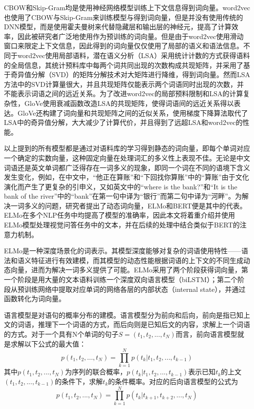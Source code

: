 CBOW和Skip-Gram均是使用神经网络模型训练上下文信息得到词向量。word2vec也使用了CBOW与Skip-Gram来训练模型与得到词向量，但是并没有使用传统的DNN模型，而是使用霍夫曼树来代替隐藏层和输出层的神经元，提高了计算效率，因此被研究者广泛地使用作为预训练的词向量。但是由于word2vec使用滑动窗口来限定上下文信息，因此得到的词向量仅仅使用了局部的语义和语法信息。不同于word2vec使用局部语料，潜在语义分析（LSA）采用统计计数的方式获得语料的全局信息，其统计预料库中每两个词共同出现的次数构成共现矩阵，并采用了基于奇异值分解（SVD）的矩阵分解技术对大矩阵进行降维，得到词向量。然而LSA方法中的SVD计算量很大，并且共现矩阵仅能表示两个词语同时出现的次数，并不能表示词语之间的远近关系。为了改进word2vec的局部预料限制和LSA的计算复杂性，GloVe使用衰减函数改造LSA的共现矩阵，使得词语间的远近关系得以表达。GloVe还构建了词向量和共现矩阵之间的近似关系，使用梯度下降算法取代了LSA中的奇异值分解，大大减少了计算代价，并且得到了远超LSA和word2vec的性能。

以上提到的所有模型都是通过对语料库的学习得到静态的词向量，即每个单词对应一个确定的实数向量，这种固定向量在处理词汇的多义性上表现不佳。无论是中文词语还是英文单词都广泛得存在一词多义的现象，即同一个词在不同的语境下含义发生变化，例如，在中文中，“他正在算账”和“下回找你算账”中的“算账”由于文化演化而产生了更复杂的引申义，又如英文中的“where is the bank?”和“It is the bank of the river”中的“bank”在第一句中译为“银行”而第二句中译为“河畔”。为解决一词多义的问题，研究者提出了动态词向量，ELMo和BERT便是其中的代表。ELMo在多个NLP任务中均提高了模型的准确率，因此本文将着重介绍并使用ELMo模型处理视觉问答任务中的文本，并在后续的处理中结合类似于BERT的注意力机制。

ELMo是一种深度场景化的词表示。其模型深度能够对复杂的词语使用特性——语法和语义特征进行有效建模，而其模型的动态性能根据词语的上下文的不同生成动态向量，进而为解决一词多义提供了可能。ELMo采用了两个阶段获得词向量，第一个阶段是用大量的文本语料训练一个深度双向语言模型（biLSTM）；第二个阶段从预训练网络中提取对应单词的网络各层的内部状态（internal state），并通过函数转化为词向量。

语言模型是对语句的概率分布的建模。语言模型分为前向和后向，前向是指已知上文的词语，推理下一个词语的方式，而后向则是已知后文的内容，求解上一个词语的方式。对于一个具有N个单词的句子$S=(t_1, t_2, ..., t_N)$而言，前向语言模型就是求解以下公式的最大值：
\begin{equation}
p(t_1, t_2, ..., t_N)=\prod_{k=1}^N p(t_k|t_1,t_2,...,t_{k-1})
\end{equation}
其中$p(t_1, t_2, ..., t_N)$为序列的联合概率，$p(t_k|t_1, t_2,..., t_{k-1})$表示已知$t_k$的上文$(t_1, t_2, ..., t_{k-1})$的条件下，求解$t_k$的条件概率。对应的后向语言模型的公式为
\begin{equation}
p(t_1, t_2, ..., t_N)=\prod_{k=1}^N p(t_k|t_{k+1},t_{k+2},...,t_N)
\end{equation}

